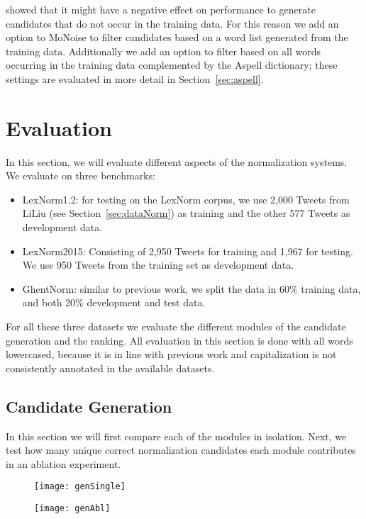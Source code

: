 \documentclass[a4paper,10pt,twoside]{article}
\begin{document}
 showed that it might have a negative effect on
performance to generate candidates that do not occur in the training data. For
this reason we add an option to MoNoise to filter candidates based on a word
list generated from the training data. Additionally we add an option to filter based
on all words occurring in the training data complemented by the Aspell dictionary; 
these settings are evaluated in more detail in Section~\ref{sec:aspell}.

 
\section{Evaluation}
\label{sec:evaluation}
In this section, we will evaluate different aspects of the normalization
systems. We evaluate on three benchmarks:
\begin{itemize}
    \item LexNorm1.2: for testing on the LexNorm corpus, we use 2,000 Tweets 
from LiLiu (see Section~\ref{sec:dataNorm}) as training and the other 577 Tweets
as development data.
    \item LexNorm2015: Consisting of 2,950 Tweets for training and
1,967 for testing. We use 950 Tweets from the training set as development data.
    \item GhentNorm: similar to previous work, we split the data in 60\%
training data, and both 20\% development and test data.
\end{itemize}
For all these three datasets we evaluate the different modules of the candidate
generation and the ranking. All evaluation in this section is done with all
words lowercased, because it is in line with previous work and capitalization
is not consistently annotated in the available datasets.



\subsection{Candidate Generation}
\label{sec:evalGen}
In this section we will first compare each of the modules in isolation. Next,
we test how many unique correct normalization candidates each module 
contributes in an ablation experiment.

\begin{figure}
    \centering
    \begin{minipage}{.45\textwidth}
        \centering
        \texttt{[image: genSingle]}
        \label{fig:single}
    \end{minipage}\hspace{1cm}
    \begin{minipage}{.45\textwidth}
        \centering
        \texttt{[image: genAbl]}
        \label{fig:abl}
    \end{minipage}
\end{figure}
\end{document}

